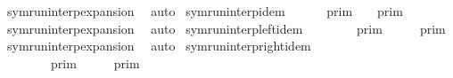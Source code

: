 \begin{isabellebody}
%
\isadelimproof
%
\endisadelimproof
%
\isatagproof
{}\isamarkupfalse%
\ symrun{\isacharunderscore}interp{\isacharunderscore}expansion\ \isamarkupfalse%
\ auto%
\endisatagproof
{\isafoldproof}%
%
\isadelimproof
\isanewline
%
\endisadelimproof
\isanewline
{}\isamarkupfalse%
\ symrun{\isacharunderscore}interp{\isacharunderscore}idem{\isacharcolon}\isanewline
\ \ {\isacartoucheopen}{\isasymlbrakk}{\isasymlbrakk}\ {\isasymGamma}\ {\isacharat}\ {\isasymGamma}\ {\isasymrbrakk}{\isasymrbrakk}\isactrlsub p\isactrlsub r\isactrlsub i\isactrlsub m\ {\isacharequal}\ {\isasymlbrakk}{\isasymlbrakk}\ {\isasymGamma}\ {\isasymrbrakk}{\isasymrbrakk}\isactrlsub p\isactrlsub r\isactrlsub i\isactrlsub m{\isacartoucheclose}\isanewline
%
\isadelimproof
%
\endisadelimproof
%
\isatagproof
{}\isamarkupfalse%
\ symrun{\isacharunderscore}interp{\isacharunderscore}expansion\ \isamarkupfalse%
\ auto%
\endisatagproof
{\isafoldproof}%
%
\isadelimproof
\isanewline
%
\endisadelimproof
\isanewline
{}\isamarkupfalse%
\ symrun{\isacharunderscore}interp{\isacharunderscore}left{\isacharunderscore}idem{\isacharcolon}\isanewline
\ \ {\isacartoucheopen}{\isasymlbrakk}{\isasymlbrakk}\ {\isasymGamma}\ {\isacharat}\ {\isacharparenleft}{\isasymGamma}\ {\isacharat}\ {\isasymGamma}\ {\isasymrbrakk}{\isasymrbrakk}\isactrlsub p\isactrlsub r\isactrlsub i\isactrlsub m\ {\isacharequal}\ {\isasymlbrakk}{\isasymlbrakk}\ {\isasymGamma}\ {\isacharat}\ {\isasymGamma}\ {\isasymrbrakk}{\isasymrbrakk}\isactrlsub p\isactrlsub r\isactrlsub i\isactrlsub m{\isacartoucheclose}\isanewline
%
\isadelimproof
%
\endisadelimproof
%
\isatagproof
{}\isamarkupfalse%
\ symrun{\isacharunderscore}interp{\isacharunderscore}expansion\ \isamarkupfalse%
\ auto%
\endisatagproof
{\isafoldproof}%
%
\isadelimproof
\isanewline
%
\endisadelimproof
\isanewline
{}\isamarkupfalse%
\ symrun{\isacharunderscore}interp{\isacharunderscore}right{\isacharunderscore}idem{\isacharcolon}\isanewline
\ \ {\isacartoucheopen}{\isasymlbrakk}{\isasymlbrakk}\ {\isacharparenleft}{\isasymGamma}\ {\isacharat}\ {\isasymGamma}\ {\isacharat}\ {\isasymGamma}\ {\isasymrbrakk}{\isasymrbrakk}\isactrlsub p\isactrlsub r\isactrlsub i\isactrlsub m\ {\isacharequal}\ {\isasymlbrakk}{\isasymlbrakk}\ {\isasymGamma}\ {\isacharat}\ {\isasymGamma}\ {\isasymrbrakk}{\isasymrbrakk}\isactrlsub p\isactrlsub r\isactrlsub i\isactrlsub m{\isacartoucheclose}\isanewline

\end{isabellebody}

